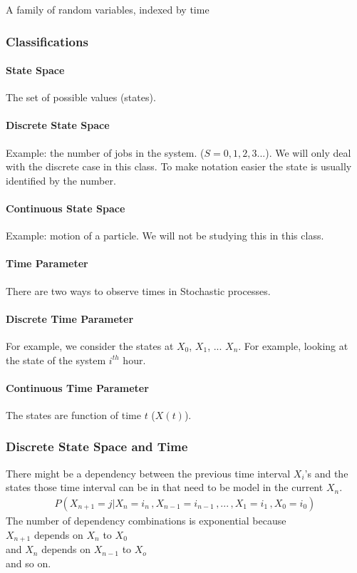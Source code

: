 
A family of random variables, indexed by time

\subsubsection{Classifications}

\paragraph{State Space} The set of possible values (states).
\paragraph{Discrete State Space} Example: the number of jobs in the system.
($S = {0,1,2,3...}$). We will only deal with the discrete case in this class. To
make notation easier the state is usually identified by the number.

\paragraph{Continuous State Space} Example: motion of a particle. We will not be
studying this in this class.

\paragraph{Time Parameter} There are two ways to observe times in Stochastic
processes.

\paragraph{Discrete Time Parameter} For example, we consider the states at
$X_0$, $X_1$, ... $X_n$. For example, looking at the state of the system
$i^{th}$ hour.

%

\paragraph{Continuous Time Parameter}
The states are function of time $t$ ($X(t)$).

\subsubsection{Discrete State Space and Time} There might be a dependency
between the previous time interval $X_i$'s and the states those time interval
can be in that need to be model in the current $X_n$. 
\begin{equation*} \begin{split}
	P(X_{n+1} = j | X_n = i_n\, , X_{n-1} = i_{n-1}\, , ... \, , X_1 = i_1\, ,X_0 = i_0)
\end{split} \end{equation*}
The number of dependency combinations is exponential because \\
$X_{n+1}$ depends on $X_n$ to $X_0$ \\
and $X_{n}$ depends on $X_{n-1}$ to $X_o$ \\
and so on. 

